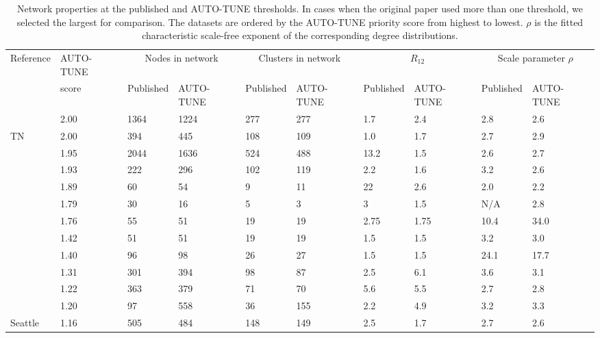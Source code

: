 \documentclass[utf8]{FrontiersinHarvard} %
\begin{document}
\begin{table}[h]
	\caption{Network properties at the published and AUTO-TUNE thresholds. In cases when the original paper used more than one threshold, we selected the largest for comparison. The datasets are ordered by the AUTO-TUNE priority score from highest to lowest. $\rho$ is the fitted characteristic scale-free exponent of the corresponding degree distributions.}
	\vspace{10pt}
	\centering
	\begin{ssmall}
	\label{tab:paperComparisonProp}
	\begin{tabular}{llllllllll}
	   \hline
		Reference  & AUTO-TUNE & \multicolumn{2}{c}{Nodes in network} &  \multicolumn{2}{c}{Clusters in network} & \multicolumn{2}{c}{$R_{12}$} & \multicolumn{2}{c}{Scale parameter $\rho$} \\
		& score & Published & AUTO-TUNE & Published & AUTO-TUNE  & Published & AUTO-TUNE & Published & AUTO-TUNE  \\
	 \hline
		\cite{Li:2022aa} &  2.00 & 1364 & 1224 & 277 & 277 & 1.7 & 2.4 & 2.8 & 2.6 \\
		\cite{chato_public_2020} TN & 2.00 & 394 & 445 & 108 & 109 & 1.0 & 1.7 & 2.7 & 2.9 \\
		\cite{rhee_national_2019}  & 1.95 & 2044 & 1636 & 524 & 488 & 13.2 & 1.5 & 2.6 & 2.7\\
		\cite{bbosa_short_2020}  & 1.93 & 222 & 296 &  102 & 119 & 2.2 & 1.6 & 3.2 & 2.6\\
		\citet{dalai_combining_2018} & 1.89 & 60 & 54 & 9 & 11 & 22 & 2.6 & 2.0 & 2.2  \\ %
		\cite{Temereanca:2017aa} & 1.79 & 30 & 16 & 5 & 3 & 3 & 1.5 & N/A & 2.8\\
		\cite{Yu:2022aa} &  1.76 & 55 &  51 & 19 & 19 & 2.75 &1.75 & 10.4 & 34.0\\
		\citet{sivay_hiv-1_2018} & 1.42 & 51 & 51 & 19 & 19 & 1.5 & 1.5 & 3.2 & 3.0\\
		\cite{Zai:2020aa}  & 1.40 & 96 & 98 & 26 & 27 & 1.5 & 1.5 & 24.1 & 17.7 \\ %
		\cite{Little:2014aa}  & 1.31 & 301 & 394 & 98 & 87 & 2.5& 6.1 & 3.6 & 3.1\\ %
		\cite{brenner_role_2021}  & 1.22 & 363 &  379 & 71 & 70 & 5.6 & 5.5 & 2.7 & 2.8 \\
		\cite{Stecher:2018aa} & 1.20 & 97 & 558 & 36 & 155 & 2.2 & 4.9 & 3.2 & 3.3 \\
		\cite{chato_public_2020} Seattle & 1.16 & 505 & 484 & 148 & 149 & 2.5 & 1.7 & 2.7 & 2.6 \\

\end{tabular}
\end{ssmall}
\end{table}
\end{document}
